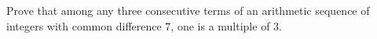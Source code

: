 Prove that among any three consecutive terms of an arithmetic sequence of integers with common difference $7$, one is a multiple of $3$.
